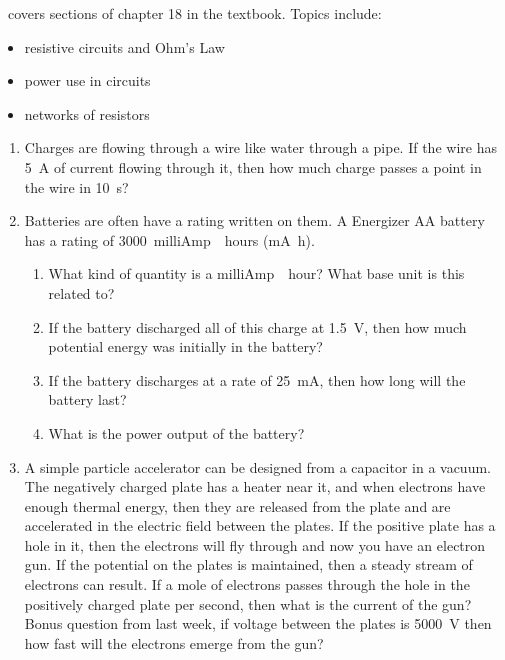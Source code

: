 \week \ covers sections of chapter 18 in the textbook. Topics include:

\begin{itemize}
	\item resistive circuits and Ohm's Law
	\item power use in circuits
	\item networks of resistors
\end{itemize}

\begin{enumerate}
	\setlength\itemsep{2 in}
	
	\item
	Charges are flowing through a wire like water through a pipe. If the wire has \SI{5}{\ampere} of current flowing through it, then how much charge passes a point in the wire in \SI{10}{s}?
	
	\item
	Batteries are often have a rating written on them. A Energizer AA battery has a rating of \SI{3000}{milliAmp \cdot hours} (\si{\milli\ampere\hour}). 
	\begin{enumerate}
	\setlength\itemsep{1.25 in}
	\item What kind of quantity is a \si{milliAmp \cdot hour}? What base unit is this related to? 
	\item If the battery discharged all of this charge at \SI{1.5}{\volt}, then how much potential energy was initially in the battery? 
	\item If the battery discharges at a rate of \SI{25}{\milli\ampere}, then how long will the battery last? 
	\item What is the power output of the battery? 
	\end{enumerate}

   \item A simple particle accelerator can be designed from a capacitor in a vacuum. The negatively charged plate has a heater near it, and when electrons have enough thermal energy, then they are released from the plate and are accelerated in the electric field between the plates. If the positive plate has a hole in it, then the electrons will fly through and now you have an electron gun. If the potential on the plates is maintained, then a steady stream of electrons can result. If a mole of electrons passes through the hole in the positively charged plate per second, then what is the current of the gun? Bonus question from last week, if voltage between the plates is \SI{5000}{\volt} then how fast will the electrons emerge from the gun?
   

\end{enumerate}
